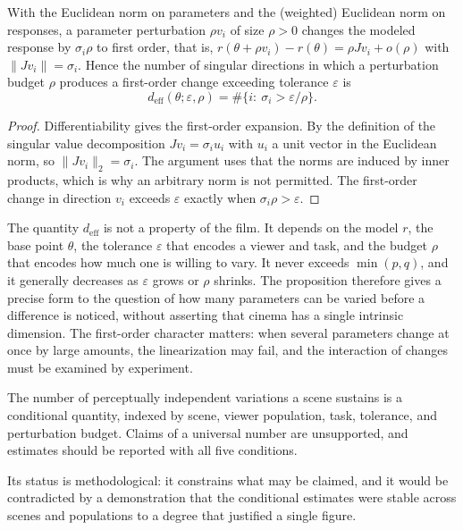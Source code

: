 \begin{proposition}\label{prop:effdim}
With the Euclidean norm on parameters and the (weighted) Euclidean norm on responses, a parameter perturbation $\rho v_i$ of size $\rho>0$ changes the modeled response by $\sigma_i\rho$ to first order, that is, $r(\theta+\rho v_i)-r(\theta)=\rho Jv_i+o(\rho)$ with $\lVert Jv_i\rVert=\sigma_i$. Hence the number of singular directions in which a perturbation budget $\rho$ produces a first-order change exceeding tolerance $\varepsilon$ is
\[
d_{\mathrm{eff}}(\theta;\varepsilon,\rho)=\#\{i:\ \sigma_i>\varepsilon/\rho\}.
\]
\end{proposition}

\begin{proof}
Differentiability gives the first-order expansion. By the definition of the singular value decomposition $Jv_i=\sigma_iu_i$ with $u_i$ a unit vector in the Euclidean norm, so $\lVert Jv_i\rVert_2=\sigma_i$. The argument uses that the norms are induced by inner products, which is why an arbitrary norm is not permitted. The first-order change in direction $v_i$ exceeds $\varepsilon$ exactly when $\sigma_i\rho>\varepsilon$.
\end{proof}

The quantity $d_{\mathrm{eff}}$ is not a property of the film. It depends on the model $r$, the base point $\theta$, the tolerance $\varepsilon$ that encodes a viewer and task, and the budget $\rho$ that encodes how much one is willing to vary. It never exceeds $\min(p,q)$, and it generally decreases as $\varepsilon$ grows or $\rho$ shrinks. The proposition therefore gives a precise form to the question of how many parameters can be varied before a difference is noticed, without asserting that cinema has a single intrinsic dimension. The first-order character matters: when several parameters change at once by large amounts, the linearization may fail, and the interaction of changes must be examined by experiment.

\begin{principle}\label{pr:conditional}
The number of perceptually independent variations a scene sustains is a conditional quantity, indexed by scene, viewer population, task, tolerance, and perturbation budget. Claims of a universal number are unsupported, and estimates should be reported with all five conditions.
\end{principle}

Its status is methodological: it constrains what may be claimed, and it would be contradicted by a demonstration that the conditional estimates were stable across scenes and populations to a degree that justified a single figure.

